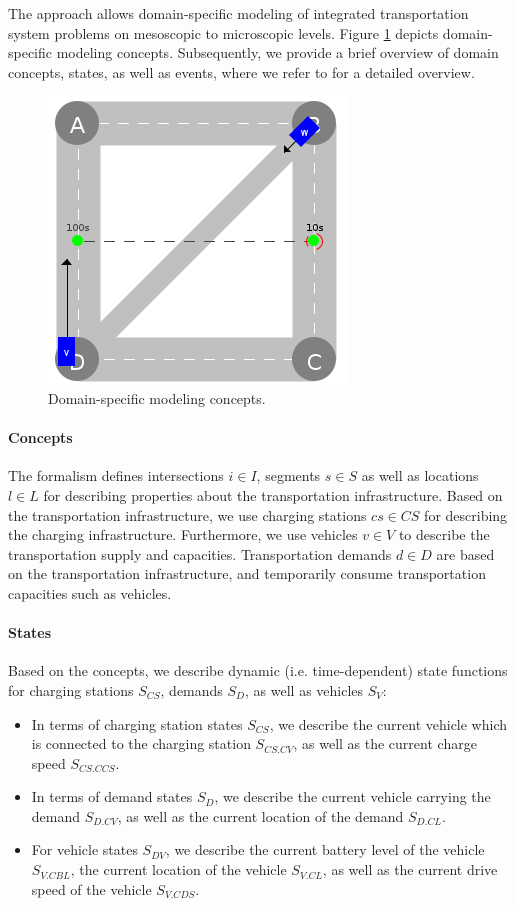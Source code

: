 \documentclass[a4paper,twoside]{article}
\begin{document}
	The approach allows domain-specific modeling of integrated transportation system problems on mesoscopic to microscopic levels.
	Figure \ref{fig:domain-specific-modeling} depicts domain-specific modeling concepts. Subsequently, we provide a brief overview of domain concepts, states, as well as events, where we refer to \cite{ascher2023discrete} for a detailed overview. 
	\begin{figure}[!ht]
		\centering
		\includegraphics[width=0.42\columnwidth]{../../events/demand.png}
		\caption{Domain-specific modeling concepts.}
		\label{fig:domain-specific-modeling}
	\end{figure}
	
	\paragraph{Concepts}
	
	The formalism defines intersections $i \in I$, segments $s \in S$ as well as locations $l \in L$ for describing properties about the transportation infrastructure.
	Based on the transportation infrastructure, we use charging stations $cs \in CS$ for describing the charging infrastructure. Furthermore, we use vehicles $v \in V$ to describe the transportation supply and capacities. Transportation demands $d \in D$ are based on the transportation infrastructure, and temporarily consume transportation capacities such as vehicles.
	
	\paragraph{States}
	Based on the concepts, we describe dynamic (i.e. time-dependent) state functions for charging stations $S_{CS}$, demands $S_{D}$, as well as vehicles $S_V$:
	
	\begin{itemize}
		\item In terms of charging station states $S_{CS}$, we describe the current vehicle which is connected to the charging station $S_{CS.CV}$, as well as the current charge speed $S_{CS.CCS}$.
		\item In terms of demand states $S_{D}$, we describe the current vehicle carrying the demand $S_{D.CV}$, as well as the current location of the demand $S_{D.CL}$.
		\item For vehicle states $S_{DV}$, we describe the current battery level of the vehicle $S_{V.CBL}$, the current location of the vehicle $S_{V.CL}$, as well as the current drive speed of the vehicle $S_{V.CDS}$.
	\end{itemize}
	
\end{document}
